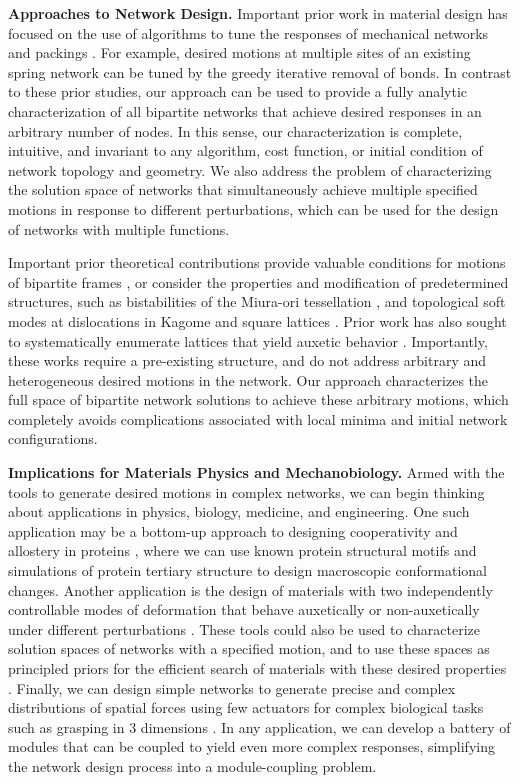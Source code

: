 \documentclass[%
preprint,
 amsmath,amssymb,
 aps,
]{revtex4-1}
\begin{document}
\noindent \textbf{Approaches to Network Design.} Important prior work in material design has focused on the use of algorithms to tune the responses of mechanical networks and packings \cite{Rocks2017,Miskin2013adapting,Yan2017,goodrich2015pruning}. For example, desired motions at multiple sites of an existing spring network can be tuned by the greedy iterative removal of bonds. In contrast to these prior studies, our approach can be used to provide a fully analytic characterization of all bipartite networks that achieve desired responses in an arbitrary number of nodes. In this sense, our characterization is complete, intuitive, and invariant to any algorithm, cost function, or initial condition of network topology and geometry. We also address the problem of characterizing the solution space of networks that simultaneously achieve multiple specified motions in response to different perturbations, which can be used for the design of networks with multiple functions. 

Important prior theoretical contributions provide valuable conditions for motions of bipartite frames \cite{whiteley1984}, or consider the properties and modification of predetermined structures, such as bistabilities of the Miura-ori tessellation \cite{silverberg2014origami}, and topological soft modes at dislocations in Kagome and square lattices \cite{paulose2015topological}. Prior work has also sought to systematically enumerate lattices that yield auxetic behavior \cite{korner2015auxetic}. Importantly, these works require a pre-existing structure, and do not address arbitrary and heterogeneous desired motions in the network. Our approach characterizes the full space of bipartite network solutions to achieve these arbitrary motions, which completely avoids complications associated with local minima and initial network configurations.

\noindent \textbf{Implications for Materials Physics and Mechanobiology.} Armed with the tools to generate desired motions in complex networks, we can begin thinking about applications in physics, biology, medicine, and engineering. One such application may be a bottom-up approach to designing cooperativity and allostery in proteins \cite{lukin2004heme,kamata2004allostery}, where we can use known protein structural motifs \cite{englander2014,papaleo2016} and simulations of protein tertiary structure to design macroscopic conformational changes. Another application is the design of materials with two independently controllable modes of deformation that behave auxetically or non-auxetically under different perturbations \cite{lee2012auxetic}. These tools could also be used to characterize solution spaces of networks with a specified motion, and to use these spaces as principled priors for the efficient search of materials with these desired properties \cite{dagdelen2017search}. Finally, we can design simple networks to generate precise and complex distributions of spatial forces using few actuators for complex biological tasks such as grasping in 3 dimensions \cite{yuzheng2005grasp}. In any application, we can develop a battery of modules that can be coupled to yield even more complex responses, simplifying the network design process into a module-coupling problem.
\end{document}
